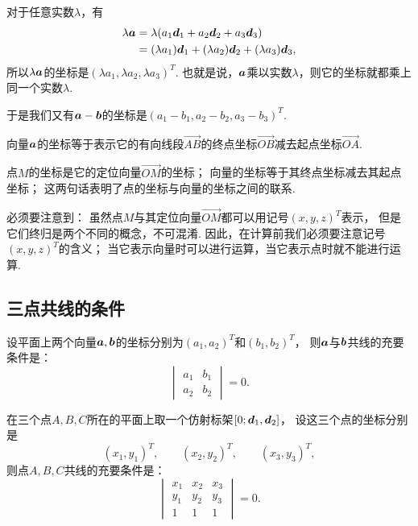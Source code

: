 对于任意实数\(\lambda\)，有\begin{align*}
\lambda \boldsymbol{a}
&= \lambda (a_1 \boldsymbol{d}_1 + a_2 \boldsymbol{d}_2 + a_3 \boldsymbol{d}_3) \\
&= (\lambda a_1) \boldsymbol{d}_1 + (\lambda a_2) \boldsymbol{d}_2 + (\lambda a_3) \boldsymbol{d}_3,
\end{align*}
所以\(\lambda \boldsymbol{a}\)的坐标是\((\lambda a_1,\lambda a_2,\lambda a_3)^T\).
也就是说，\(\boldsymbol{a}\)乘以实数\(\lambda\)，则它的坐标就都乘上同一个实数\(\lambda\).

于是我们又有\(\boldsymbol{a}-\boldsymbol{b}\)的坐标是\((a_1-b_1,a_2-b_2,a_3-b_3)^T\).

\begin{theorem}
向量\(\boldsymbol{a}\)的坐标等于表示它的有向线段\(\vec{AB}\)的终点坐标\(\vec{OB}\)减去起点坐标\(\vec{OA}\).
\end{theorem}

点\(M\)的坐标是它的定位向量\(\vec{OM}\)的坐标；
向量的坐标等于其终点坐标减去其起点坐标；
这两句话表明了点的坐标与向量的坐标之间的联系.

必须要注意到：
虽然点\(M\)与其定位向量\(\vec{OM}\)都可以用记号\((x,y,z)^T\)表示，%
但是它们终归是两个不同的概念，不可混淆.
因此，在计算前我们必须要注意记号\((x,y,z)^T\)的含义；
当它表示向量时可以进行运算，当它表示点时就不能进行运算.

\subsection{三点共线的条件}
\begin{theorem}\label{theorem:解析几何.平面上两向量共线的充要条件}
设平面上两个向量\(\boldsymbol{a},\boldsymbol{b}\)的坐标分别为\((a_1,a_2)^T\)和\((b_1,b_2)^T\)，
则\(\boldsymbol{a}\)与\(\boldsymbol{b}\)共线的充要条件是：\[
\begin{vmatrix}
	a_1 & b_1 \\
	a_2 & b_2
\end{vmatrix} = 0.
\]
\end{theorem}

\begin{theorem}\label{theorem:解析几何.平面上三点共线的充要条件}
在三个点\(A,B,C\)所在的平面上取一个仿射标架\([0;\boldsymbol{d}_1,\boldsymbol{d}_2]\)，
设这三个点的坐标分别是\[
	(x_1,y_1)^T, \qquad
	(x_2,y_2)^T, \qquad
	(x_3,y_3)^T,
\]
则点\(A,B,C\)共线的充要条件是：\[
\begin{vmatrix}
	x_1 & x_2 & x_3 \\
	y_1 & y_2 & y_3 \\
	1 & 1 & 1
\end{vmatrix} = 0.
\]
\end{theorem}

